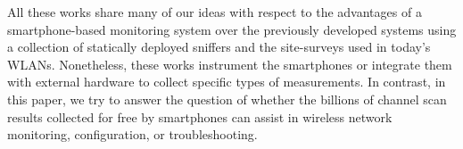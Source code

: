 All these works share many of our ideas with respect to the advantages
of a smartphone-based monitoring system over the previously developed
systems using a collection of statically deployed sniffers and the
site-surveys used in today's WLANs. Nonetheless, these works
instrument the smartphones or integrate them with external hardware to
collect specific types of measurements. In contrast, in this paper, we
try to answer the question of whether the billions of \wifi{} channel
scan results collected for free by smartphones can assist in wireless
network monitoring, configuration, or troubleshooting.
